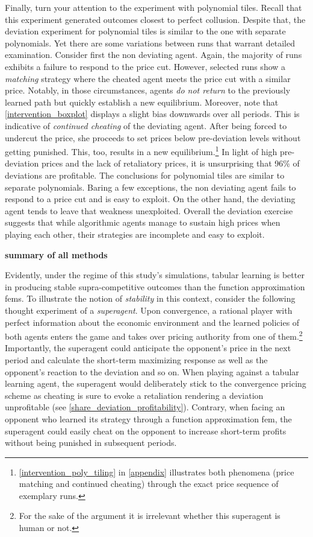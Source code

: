 Finally, turn your attention to the experiment with polynomial tiles. Recall that this experiment generated outcomes closest to perfect collusion. Despite that, the deviation experiment for polynomial tiles is similar to the one with separate polynomials. Yet there are some variations between runs that warrant detailed examination. Consider first the non deviating agent. Again, the majority of runs exhibits a failure to respond to the price cut. However, selected runs show a \emph{matching} strategy where the cheated agent meets the price cut with a similar price. Notably, in those circumstances, agents \emph{do not return} to the previously learned path but quickly establish a new equilibrium. Moreover, note that \autoref{intervention_boxplot} displays a slight bias downwards over all periods. This is indicative of \emph{continued cheating} of the deviating agent. After being forced to undercut the price, she proceeds to set prices below pre-deviation levels without getting punished. This, too, results in a new equilibrium.\footnote{\autoref{intervention_poly_tiling} in \autoref{appendix} illustrates both phenomena (price matching and continued cheating) through the exact price sequence of exemplary runs.} In light of high pre-deviation prices and the lack of retaliatory prices, it is unsurprising that 96\% of deviations are profitable. The conclusions for polynomial tiles are similar to separate polynomials. Baring a few exceptions, the non deviating agent fails to respond to a price cut and is easy to exploit. On the other hand, the deviating agent tends to leave that weakness unexploited.
Overall the deviation exercise suggests that while algorithmic agents manage to sustain high prices when playing each other, their strategies are incomplete and easy to exploit.

\textbf{summary of all methods}

Evidently, under the regime of this study's simulations, tabular learning is better in producing stable supra-competitive outcomes than the function approximation \gls{fem}s. To illustrate the notion of \emph{stability} in this context, consider the following thought experiment of a \emph{superagent}. Upon convergence, a rational player with perfect information about the economic environment and the learned policies of both agents enters the game and takes over pricing authority from one of them.\footnote{For the sake of the argument it is irrelevant whether this superagent is human or not.} Importantly, the superagent could anticipate the opponent's price in the next period and calculate the short-term maximizing response as well as the opponent's reaction to the deviation and so on. When playing against a tabular learning agent, the superagent would deliberately stick to the convergence pricing scheme as cheating is sure to evoke a retaliation rendering a deviation unprofitable (see \autoref{share_deviation_profitability}). Contrary, when facing an opponent who learned its strategy through a function approximation \gls{fem}, the superagent could easily cheat on the opponent to increase short-term profits without being punished in subsequent periods.

